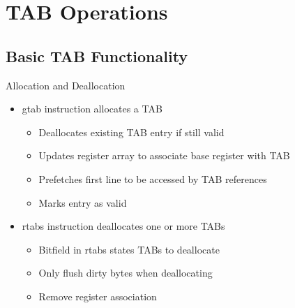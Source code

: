 \documentclass{beamer}
\begin{document}
\section{TAB Operations}
\subsection{Basic TAB Functionality}
\begin{frame}{Allocation and Deallocation}
   \begin{itemize}
      \item gtab instruction allocates a TAB
         \begin{itemize}
            \item Deallocates existing TAB entry if still valid
            \item Updates register array to associate base register with TAB
            \item Prefetches first line to be accessed by TAB references
            \item Marks entry as valid
         \end{itemize}
      \item rtabs instruction deallocates one or more TABs
         \begin{itemize}
            \item Bitfield in rtabs states TABs to deallocate
            \item Only flush dirty bytes when deallocating
            \item Remove register association
         \end{itemize}
   \end{itemize}
\end{frame}
\end{document}
